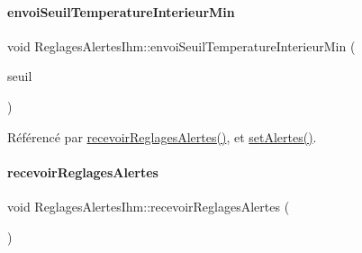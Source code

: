 \paragraph{\texorpdfstring{envoi\+Seuil\+Temperature\+Interieur\+Min}{envoiSeuilTemperatureInterieurMin}}
{\footnotesize\ttfamily void Reglages\+Alertes\+Ihm\+::envoi\+Seuil\+Temperature\+Interieur\+Min (\begin{DoxyParamCaption}\item[{Q\+String}]{seuil }\end{DoxyParamCaption})\hspace{0.3cm}{\ttfamily [signal]}}



Référencé par \hyperlink{class_reglages_alertes_ihm_a5c40f718b28b948a90574ef0c2d3e587}{recevoir\+Reglages\+Alertes()}, et \hyperlink{class_reglages_alertes_ihm_aeb0331a6103f944cb15cdd62985ca231}{set\+Alertes()}.

\mbox{\label{class_reglages_alertes_ihm_a5c40f718b28b948a90574ef0c2d3e587}} 
\paragraph{\texorpdfstring{recevoir\+Reglages\+Alertes}{recevoirReglagesAlertes}}
{\footnotesize\ttfamily void Reglages\+Alertes\+Ihm\+::recevoir\+Reglages\+Alertes (\begin{DoxyParamCaption}{ }\end{DoxyParamCaption})\hspace{0.3cm}{\ttfamily [slot]}}



